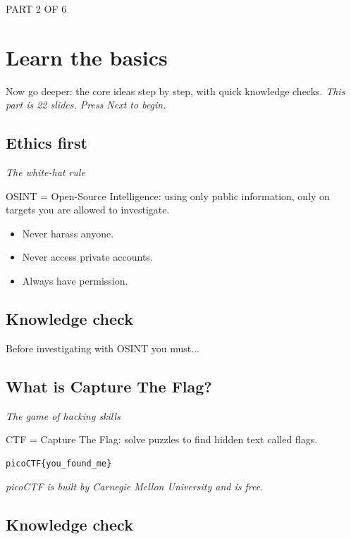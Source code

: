 \documentclass[12pt,openany]{book}
\begin{document}
\vspace{4pt}\noindent\textsc{PART 2 OF 6}


\section*{Learn the basics}

Now go deeper: the core ideas step by step, with quick knowledge checks.
{\small\itshape\color{gray}This part is 22 slides. Press Next to begin.}

\medskip

\subsection*{Ethics first}
{\small\itshape\color{gray}The white-hat rule}


OSINT = Open-Source Intelligence: using only public information, only on targets you are allowed to investigate.

\begin{itemize}
  \item Never harass anyone.
  \item Never access private accounts.
  \item Always have permission.
\end{itemize}

\medskip

\subsection*{Knowledge check}

Before investigating with OSINT you must...

\medskip

\subsection*{What is Capture The Flag?}
{\small\itshape\color{gray}The game of hacking skills}


CTF = Capture The Flag: solve puzzles to find hidden text called flags.

\begin{lstlisting}
picoCTF{you_found_me}\end{lstlisting}
{\small\itshape\color{gray}picoCTF is built by Carnegie Mellon University and is free.}

\medskip

\subsection*{Knowledge check}
\end{document}
